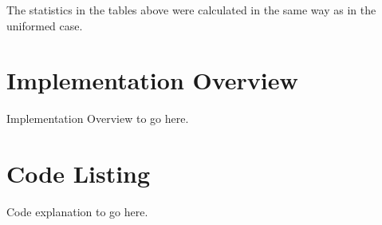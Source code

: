 \documentclass[12pt, letter]{article}
\begin{document}
\FloatBarrier

The statistics in the tables above were calculated in the same way as in the uniformed case.

\section{Implementation Overview}

Implementation Overview to go here.

\section{Code Listing}

Code explanation to go here. 
\end{document}

